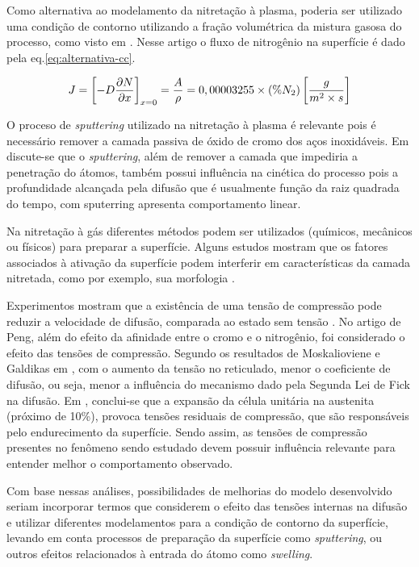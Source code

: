 Como alternativa ao modelamento da nitretação à plasma, poderia ser utilizado uma condição de contorno utilizando a fração volumétrica da mistura gasosa do processo, como visto em \cite{garzon2006modelamento}. Nesse artigo o fluxo de nitrogênio na superfície é dado pela eq.\ref{eq:alternativa-cc}.

\begin{equation} \label{eq:alternativa-cc}
 J = \left[-D\pdv{N}{x}\right]_{x=0} = \dfrac{A}{\rho} = 0,00003255 \times (\%N_2)  \left[\frac{g}{m^2\times s}\right]
\end{equation}

O proceso de \textit{sputtering} utilizado na nitretação à plasma é relevante pois é necessário remover a camada passiva de óxido de cromo dos aços inoxidáveis. Em \cite{moller2001surface} discute-se que o \textit{sputtering}, além de remover a camada que impediria a penetração do átomos, também possui influência na cinética do processo pois a profundidade alcançada pela difusão que é usualmente função da raiz quadrada do tempo, com sputerring apresenta comportamento linear.

Na nitretação à gás diferentes métodos podem ser utilizados (químicos, mecânicos ou físicos) para preparar a superfície. Alguns estudos mostram que os fatores associados à ativação da superfície podem interferir em características da camada nitretada, como por exemplo, sua morfologia \cite{baranowska2010importance}.


Experimentos mostram que a existência de uma tensão de compressão pode reduzir a velocidade de difusão, comparada ao estado sem tensão \cite{peng2018numerical}. No artigo de Peng, além do efeito da afinidade entre o cromo e o nitrogênio, foi considerado o efeito das tensões de compressão. Segundo os resultados de  Moskalioviene e Galdikas em \cite{moskalioviene2011stress}, com o aumento da tensão no reticulado, menor o coeficiente de difusão, ou seja, menor a influência do mecanismo dado pela Segunda Lei de Fick na difusão. Em \cite{tschiptschin2010estrutura}, conclui-se que a expansão da célula unitária na austenita (próximo de 10\%), provoca tensões residuais de compressão, que são responsáveis pelo endurecimento da superfície. Sendo assim, as tensões de compressão presentes no fenômeno sendo estudado devem possuir influência relevante para entender melhor o comportamento observado.

Com base nessas análises, possibilidades de melhorias do modelo desenvolvido seriam incorporar termos que considerem o efeito das tensões internas na difusão e utilizar diferentes modelamentos para a condição de contorno da superfície, levando em conta processos de preparação da superfície como \textit{sputtering}, ou outros efeitos relacionados à entrada do átomo como \textit{swelling}.
